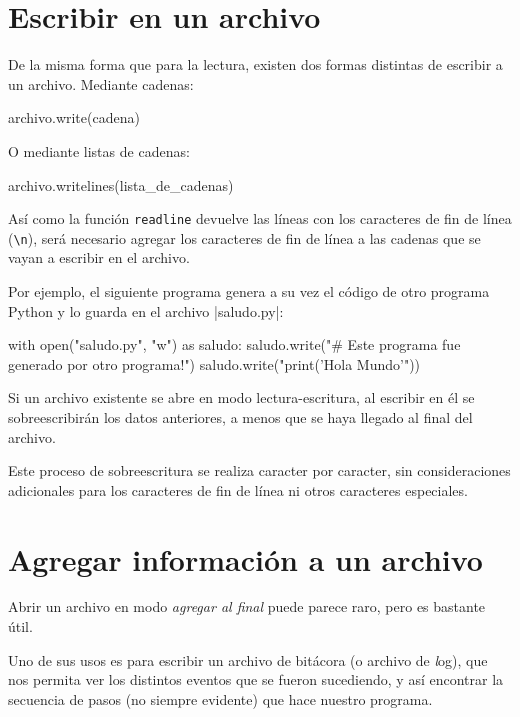 \section{Escribir en un archivo}

De la misma forma que para la lectura, existen dos formas distintas de
escribir a un archivo.  Mediante cadenas:

\begin{codigo-python-sn}
archivo.write(cadena)
\end{codigo-python-sn}

O mediante listas de cadenas:

\begin{codigo-python-sn}
archivo.writelines(lista_de_cadenas)
\end{codigo-python-sn}

Así como la función \lstinline!readline! devuelve las líneas con los caracteres
de fin de línea (\lstinline!\n!), será necesario agregar los caracteres de
fin de línea a las cadenas que se vayan a escribir en el archivo.

Por ejemplo, el siguiente programa genera a su vez el código de otro programa
Python y lo guarda en el archivo |saludo.py|:

\begin{codigo-python-sn}
with open("saludo.py", "w") as saludo:
    saludo.write("# Este programa fue generado por otro programa!\n")
    saludo.write("print('Hola Mundo'\n"))
\end{codigo-python-sn}

\begin{atencion}
Si un archivo existente se abre en modo lectura-escritura, al escribir en
él se sobreescribirán los datos anteriores, a menos que se haya llegado al
final del archivo.

Este proceso de sobreescritura se realiza caracter por caracter, sin
consideraciones adicionales para los caracteres de fin de línea ni otros
caracteres especiales.
\end{atencion}

\section{Agregar información a un archivo}

Abrir un archivo en modo {\it agregar al final} puede parece raro,
pero es bastante útil.

Uno de sus usos es para escribir un archivo de bitácora (o archivo de
{\textit log}), que nos permita ver los distintos eventos que se fueron
sucediendo, y así encontrar la secuencia de pasos (no siempre evidente) que
hace nuestro programa.

